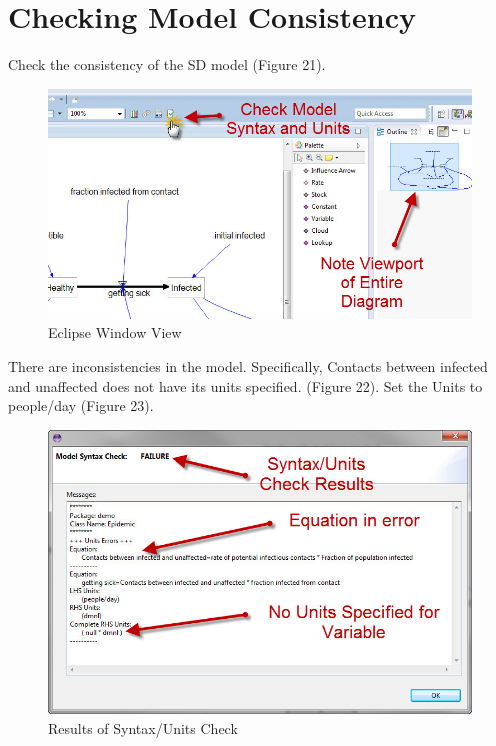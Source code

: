 \documentclass[11pt]{amsart}
\begin{document}
\section{Checking Model Consistency}
Check the consistency of the SD model (Figure 21).



\begin{figure}[ht]
\begin{center}
\vspace{.2in}
\centerline {
\includegraphics[totalheight=0.4\textheight]{images/021.jpg}
}
\caption{Eclipse Window View}
\label{fig:021}
\end{center}
\end{figure}


There are inconsistencies in the model. Specifically, Contacts between infected and unaffected does not have its units specified. (Figure 22). Set the Units to people/day (Figure 23).

\clearpage


\begin{figure}[ht]
\begin{center}
\vspace{.2in}
\centerline {
\includegraphics[totalheight=0.3\textheight]{images/022.jpg}
}
\caption{Results of Syntax/Units Check}
\label{fig:022}
\end{center}
\end{figure}
\end{document}
